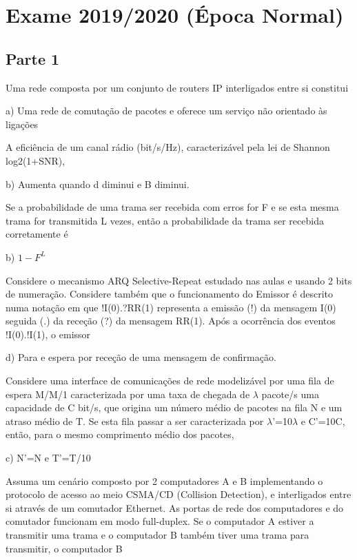 \documentclass[addpoints]{exam}
\begin{document}
\section*{Exame 2019/2020 (Época Normal)}

\subsection*{Parte 1}

\begin{questions}

\question Uma rede composta por um conjunto de routers IP interligados entre si constitui

a) Uma rede de comutação de pacotes e oferece um serviço não orientado às ligações

\question A eficiência de um canal rádio (bit/s/Hz), caracterizável pela lei de Shannon log2(1+SNR),

b) Aumenta quando d diminui e B diminui. 

\question Se a probabilidade de uma trama ser recebida com erros for F e se esta mesma trama for transmitida L vezes, então a probabilidade da trama ser recebida corretamente é 

b) $1-F^{L}$ 


\question Considere o mecanismo ARQ Selective-Repeat estudado nas aulas e usando 2 bits de numeração. Considere também
que o funcionamento do Emissor é descrito numa notação em que !I(0).?RR(1) representa a emissão (!) da
mensagem I(0) seguida (.) da receção (?) da mensagem RR(1). Após a ocorrência dos eventos !I(0).!I(1), o emissor

d) Para e espera por receção de uma mensagem de confirmação.

\question Considere uma interface de comunicações de rede modelizável por uma fila de espera M/M/1 caracterizada por uma taxa de chegada de $\lambda$ pacote/s uma capacidade de C bit/s, que origina um número médio de pacotes na fila N e um atraso médio de T. Se esta fila passar a ser caracterizada por $\lambda$’=10$\lambda$ e C’=10C, então, para o mesmo comprimento médio dos pacotes,

c) N’=N e T’=T/10

\question Assuma um cenário composto por 2 computadores A e B implementando o protocolo de acesso ao meio CSMA/CD
(Collision Detection), e interligados entre si através de um comutador Ethernet. As portas de rede dos computadores
e do comutador funcionam em modo full-duplex. Se o computador A estiver a transmitir uma trama e o computador
B também tiver uma trama para transmitir, o computador B


\end{questions}
\end{document}
